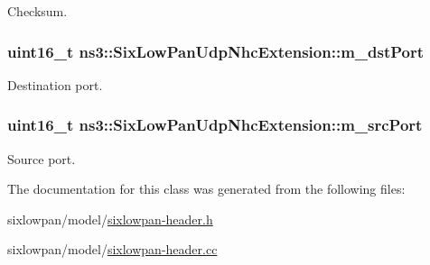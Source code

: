 Checksum. 

\subsubsection[{\texorpdfstring{m\+\_\+dst\+Port}{m_dstPort}}]{\setlength{\rightskip}{0pt plus 5cm}uint16\+\_\+t ns3\+::\+Six\+Low\+Pan\+Udp\+Nhc\+Extension\+::m\+\_\+dst\+Port\hspace{0.3cm}{\ttfamily [private]}}\hypertarget{classns3_1_1SixLowPanUdpNhcExtension_ad66622e5fda4895f8f528dce9a62202e}{}\label{classns3_1_1SixLowPanUdpNhcExtension_ad66622e5fda4895f8f528dce9a62202e}


Destination port. 

\subsubsection[{\texorpdfstring{m\+\_\+src\+Port}{m_srcPort}}]{\setlength{\rightskip}{0pt plus 5cm}uint16\+\_\+t ns3\+::\+Six\+Low\+Pan\+Udp\+Nhc\+Extension\+::m\+\_\+src\+Port\hspace{0.3cm}{\ttfamily [private]}}\hypertarget{classns3_1_1SixLowPanUdpNhcExtension_aeb61efab041137331d4a3a64574e7f5d}{}\label{classns3_1_1SixLowPanUdpNhcExtension_aeb61efab041137331d4a3a64574e7f5d}


Source port. 



The documentation for this class was generated from the following files\+:\begin{DoxyCompactItemize}
\item 
sixlowpan/model/\hyperlink{sixlowpan-header_8h}{sixlowpan-\/header.\+h}\item 
sixlowpan/model/\hyperlink{sixlowpan-header_8cc}{sixlowpan-\/header.\+cc}\end{DoxyCompactItemize}

